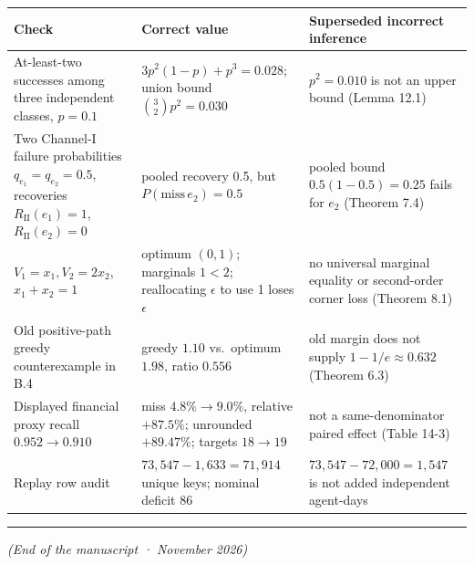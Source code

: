 \documentclass[
  11pt]{article}
\begin{document}
\begin{longtable}[]{@{}
  >{\raggedright\arraybackslash}p{}
  >{\raggedright\arraybackslash}p{}
  >{\raggedright\arraybackslash}p{}@{}}
\toprule\noalign{}
\begin{minipage}[b]{\linewidth}\raggedright
Check
\end{minipage} & \begin{minipage}[b]{\linewidth}\raggedright
Correct value
\end{minipage} & \begin{minipage}[b]{\linewidth}\raggedright
Superseded incorrect inference
\end{minipage} \\
\midrule\noalign{}
\endhead
\bottomrule\noalign{}
\endlastfoot
At-least-two successes among three independent classes, \(p=0.1\) &
\(3p^2(1-p)+p^3=0.028\); union bound \(\binom32p^2=0.030\) &
\(p^2=0.010\) is not an upper bound (Lemma 12.1) \\
Two Channel-I failure probabilities \(q_{e_1}=q_{e_2}=0.5\), recoveries
\(R_{\mathrm{II}}(e_1)=1\), \(R_{\mathrm{II}}(e_2)=0\) & pooled recovery
0.5, but \(P(\mathrm{miss}\,e_2)=0.5\) & pooled bound
\(0.5(1-0.5)=0.25\) fails for \(e_2\) (Theorem 7.4) \\
\(V_1=x_1,V_2=2x_2\), \(x_1+x_2=1\) & optimum \((0,1)\); marginals
\(1<2\); reallocating \(\epsilon\) to use 1 loses \(\epsilon\) & no
universal marginal equality or second-order corner loss (Theorem 8.1) \\
Old positive-path greedy counterexample in B.4 & greedy \(1.10\)
vs.~optimum \(1.98\), ratio \(0.556\) & old margin does not supply
\(1-1/e\approx0.632\) (Theorem 6.3) \\
Displayed financial proxy recall \(0.952\to0.910\) & miss
\(4.8\%\to9.0\%\), relative \(+87.5\%\); unrounded \(+89.47\%\); targets
\(18\to19\) & not a same-denominator paired effect (Table 14-3) \\
Replay row audit & \(73{,}547-1{,}633=71{,}914\) unique keys; nominal
deficit \(86\) & \(73{,}547-72{,}000=1{,}547\) is not added independent
agent-days \\
\end{longtable}

\begin{center}\rule{0.5\linewidth}{0.5pt}\end{center}

\emph{(End of the manuscript · November 2026)}
\end{document}
